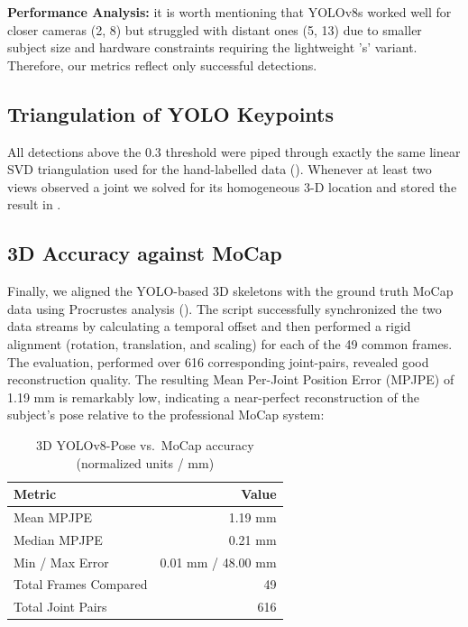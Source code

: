\documentclass[11pt,a4paper]{article}
\begin{document}
\textbf{Performance Analysis:} it is worth mentioning that YOLOv8s worked well for closer cameras (2, 8) but struggled with distant ones (5, 13) due to smaller subject size and hardware constraints requiring the lightweight 's' variant. Therefore, our metrics reflect only successful detections.

\subsection*{Triangulation of YOLO Keypoints}

All detections above the 0.3 threshold were piped through exactly the same linear SVD triangulation used for the hand-labelled data (). Whenever at least two views observed a joint we solved for its homogeneous 3-D location and stored the result in .

\subsection*{3D Accuracy against MoCap}  
Finally, we aligned the YOLO-based 3D skeletons with the ground truth MoCap data using Procrustes analysis (). The script successfully synchronized the two data streams by calculating a temporal offset and then performed a rigid alignment (rotation, translation, and scaling) for each of the 49 common frames. The evaluation, performed over 616 corresponding joint-pairs, revealed good reconstruction quality. The resulting Mean Per-Joint Position Error (MPJPE) of 1.19 mm is remarkably low, indicating a near-perfect reconstruction of the subject's pose relative to the professional MoCap system:

\begin{table}[htbp]
  \centering
  \caption{3D YOLOv8-Pose vs.\ MoCap accuracy (normalized units / mm)}
  \label{tab:yolo3d-accuracy}
  \begin{tabular}{l r}
    \toprule
    \textbf{Metric}              & \textbf{Value}      \\
    \midrule
    Mean MPJPE                   & 1.19 mm             \\
    Median MPJPE                 & 0.21 mm             \\
    Min / Max Error              & 0.01 mm / 48.00 mm  \\
    Total Frames Compared        & 49                  \\
    Total Joint Pairs            & 616                 \\
    \bottomrule
  \end{tabular}
\end{table}
\end{document}
